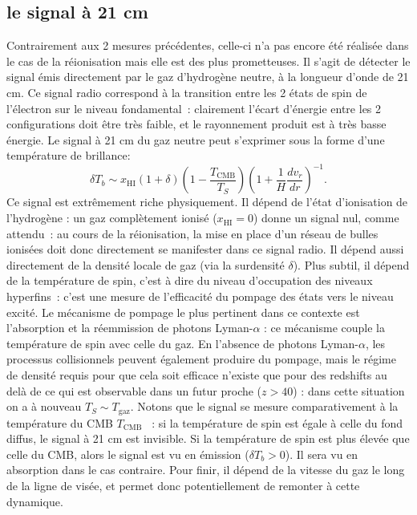 \subsection{le signal à 21 cm}
 Contrairement aux 2 mesures précédentes, celle-ci n'a pas encore été réalisée dans le cas de la réionisation mais elle est des plus prometteuses. Il s'agit de détecter le signal émis directement par le gaz d'hydrogène neutre, à la longueur d'onde de 21 cm. Ce signal radio correspond à la transition entre les 2 états de spin de l'électron sur le niveau fondamental~: clairement l'écart d'énergie entre les 2 configurations doit être très faible, et le rayonnement produit est à très basse énergie. Le signal à 21 cm du gaz neutre peut s'exprimer sous la forme d'une température de brillance:
 \begin{equation}
 \delta T_b \sim x_\mathrm{HI} (1+\delta) (1-\frac{T_\mathrm{CMB}}{T_S})(1+\frac{1}{H}\frac{d v_r}{dr})^{-1}.
 \end{equation}
 Ce signal est extrêmement riche physiquement. Il dépend de l'état d'ionisation de l'hydrogène : un gaz complètement ionisé ($x_\mathrm{HI}=0$) donne un signal nul, comme attendu~: au cours de la réionisation, la mise en place d'un réseau de bulles ionisées doit donc directement se manifester dans ce signal radio. Il dépend aussi directement de la densité locale de gaz (via la surdensité $\delta$). Plus subtil, il dépend de la température de spin, c'est à dire du niveau d'occupation des niveaux hyperfins~: c'est une mesure de l'efficacité du pompage des états vers le niveau excité. Le mécanisme de pompage le plus pertinent dans ce contexte est l'absorption et la réemmission de photons Lyman-$\alpha$ : ce mécanisme couple la température de spin avec celle du gaz.  En l'absence de photons Lyman-$\alpha$, les processus collisionnels peuvent également produire du pompage, mais le régime de densité requis pour que cela soit efficace n'existe que pour des redshifts au delà de ce qui est observable dans un futur proche ($z>40$) : dans cette situation on a à nouveau $T_S\sim T_\mathrm{gaz}$. Notons que le signal se mesure comparativement à la température du CMB $T_\mathrm{CMB}$ ~: si la température de spin est égale à celle du fond diffus, le signal à 21 cm est invisible. Si la température de spin est plus élevée que celle du CMB, alors le signal est vu en émission ($\delta T_b >0$). Il sera vu en absorption dans le cas contraire. Pour finir, il dépend de la vitesse du gaz le long de la ligne de visée, et permet donc potentiellement de remonter à cette dynamique.

